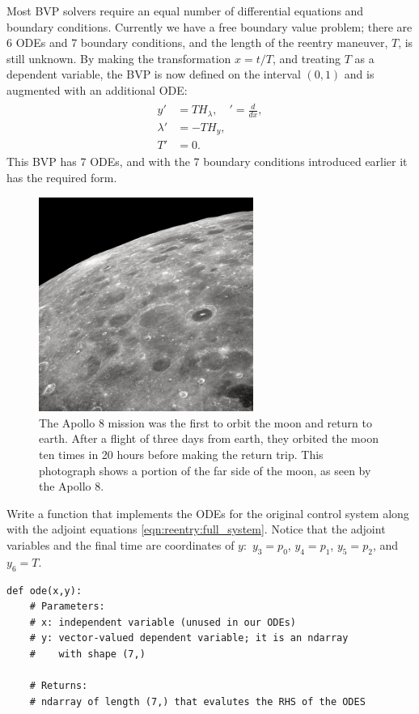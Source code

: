 Most BVP solvers require an equal number of differential equations and boundary conditions. 
Currently we have a free boundary value problem; there are 6 ODEs and 7 boundary conditions, and the length of the reentry maneuver, $T$, is still unknown. 
By making the transformation $x = t/T$, and treating $T$ as a dependent variable, the BVP is now defined on the interval $(0,1)$ and is augmented with an additional ODE: 
\begin{align}
\begin{split}
	y' &= TH_{\lambda},\quad ' = \frac{d}{dx},\\
	\lambda' &= -TH_{y},\\
	T' &= 0. \label{eqn:reentry:full_system}
\end{split}	
\end{align}
This BVP has 7 ODEs, and with the 7 boundary conditions introduced earlier it has the required form.


\begin{figure}
\centering
\includegraphics[width=7cm]{The_Lunar_Farside.jpg}
\caption{ The Apollo 8 mission was the first to orbit the moon and return to earth. 
After a flight of three days from earth, they orbited the moon ten times in 20 hours before making the return trip. 
This photograph  shows a portion of the far side of the moon, as seen by the Apollo 8.
}
\label{fig:reentry:Lunar_Farside}
\end{figure}



\begin{problem}
Write a function  that implements the ODEs for the original control system along with the adjoint equations \eqref{eqn:reentry:full_system}. 
Notice that the adjoint variables and the final time are coordinates of $y:$ $y_3 = p_0$, $y_4 = p_1$, $y_5 = p_2$, and $y_6 = T$.
\begin{lstlisting}
def ode(x,y):
	# Parameters:
	# x: independent variable (unused in our ODEs)
	# y: vector-valued dependent variable; it is an ndarray 
	# 	 with shape (7,)
	
	# Returns: 
	# ndarray of length (7,) that evalutes the RHS of the ODES
\end{lstlisting}
\end{problem}

